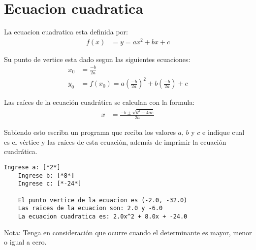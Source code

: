 \section{Ecuacion cuadratica}

La ecuacion cuadratica esta definida por:
\begin{align*}
    f(x) &= y = ax^2 + bx + c
\end{align*}

Su punto de vertice esta dado segun las siguientes ecuaciones:
\begin{align*}
    x_0 &= \frac{-b}{2a} \\
    y_0 &= f(x_0) = a\left(\frac{-b}{2a}\right)^{2} + b\left(\frac{-b}{2a}\right) + c
\end{align*}

Las raíces de la ecuación cuadrática se calculan con la formula:
\begin{align*}
    x &= \frac{-b \pm \sqrt{b^2 - 4ac}}{2a}
\end{align*}

Sabiendo esto escriba un programa que reciba los valores $a$, $b$ y $c$ e indique cual es el vértice y las raíces de esta ecuación, además de imprimir la ecuación cuadrática.

\begin{lstlisting}[style=consola]
    Ingrese a: [*2*]
    Ingrese b: [*8*]
    Ingrese c: [*-24*]
    
    El punto vertice de la ecuacion es (-2.0, -32.0)
    Las raices de la ecuacion son: 2.0 y -6.0
    La ecuacion cuadratica es: 2.0x^2 + 8.0x + -24.0
\end{lstlisting}

Nota: Tenga en consideración que ocurre cuando el determinante es mayor, menor o igual a cero.

